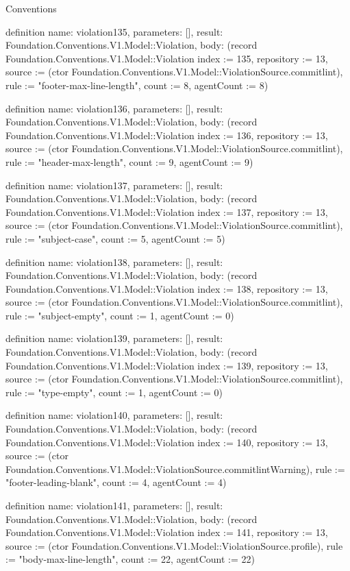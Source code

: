 \begin{lexlean}{Conventions}
\begin{semanticmodule}
definition{
  name: violation135,
  parameters: [],
  result: Foundation.Conventions.V1.Model::Violation,
  body: (record Foundation.Conventions.V1.Model::Violation {index := 135, repository := 13, source := (ctor Foundation.Conventions.V1.Model::ViolationSource.commitlint), rule := "footer-max-line-length", count := 8, agentCount := 8})
}

definition{
  name: violation136,
  parameters: [],
  result: Foundation.Conventions.V1.Model::Violation,
  body: (record Foundation.Conventions.V1.Model::Violation {index := 136, repository := 13, source := (ctor Foundation.Conventions.V1.Model::ViolationSource.commitlint), rule := "header-max-length", count := 9, agentCount := 9})
}

definition{
  name: violation137,
  parameters: [],
  result: Foundation.Conventions.V1.Model::Violation,
  body: (record Foundation.Conventions.V1.Model::Violation {index := 137, repository := 13, source := (ctor Foundation.Conventions.V1.Model::ViolationSource.commitlint), rule := "subject-case", count := 5, agentCount := 5})
}

definition{
  name: violation138,
  parameters: [],
  result: Foundation.Conventions.V1.Model::Violation,
  body: (record Foundation.Conventions.V1.Model::Violation {index := 138, repository := 13, source := (ctor Foundation.Conventions.V1.Model::ViolationSource.commitlint), rule := "subject-empty", count := 1, agentCount := 0})
}

definition{
  name: violation139,
  parameters: [],
  result: Foundation.Conventions.V1.Model::Violation,
  body: (record Foundation.Conventions.V1.Model::Violation {index := 139, repository := 13, source := (ctor Foundation.Conventions.V1.Model::ViolationSource.commitlint), rule := "type-empty", count := 1, agentCount := 0})
}

definition{
  name: violation140,
  parameters: [],
  result: Foundation.Conventions.V1.Model::Violation,
  body: (record Foundation.Conventions.V1.Model::Violation {index := 140, repository := 13, source := (ctor Foundation.Conventions.V1.Model::ViolationSource.commitlintWarning), rule := "footer-leading-blank", count := 4, agentCount := 4})
}

definition{
  name: violation141,
  parameters: [],
  result: Foundation.Conventions.V1.Model::Violation,
  body: (record Foundation.Conventions.V1.Model::Violation {index := 141, repository := 13, source := (ctor Foundation.Conventions.V1.Model::ViolationSource.profile), rule := "body-max-line-length", count := 22, agentCount := 22})
}


\end{semanticmodule}
\end{lexlean}
